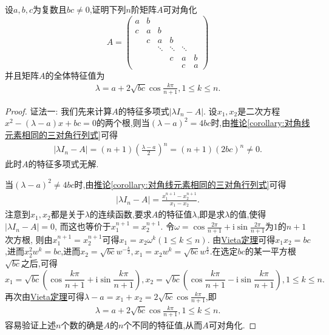 \documentclass[../../main.tex]{subfiles}%
\begin{document}
\begin{proposition}[三对角矩阵的特征值]\label{proposition:三对角矩阵必可对角化}
设$a,b,c$为复数且$bc\neq0$,证明下列$n$阶矩阵$A$可对角化
\[
A = 
\begin{pmatrix}
a&b&&&\\
c&a&b&&\\
&c&a&b&\\
&&\ddots&\ddots&\ddots\\
&&&c&a&b\\
&&&&c&a
\end{pmatrix}
\]
并且矩阵$A$的全体特征值为
\begin{align*}
\lambda=a + 2\sqrt{bc}\cos\frac{k\pi}{n + 1}, 1\leqslant  k\leqslant  n.
\end{align*}
\end{proposition}
\begin{proof}

{\color{blue}证法一:}
我们先来计算$A$的特征多项式$|\lambda I_n - A|$. 设$x_1,x_2$是二次方程$x^2 - (\lambda - a)x + bc = 0$的两个根,则当$(\lambda-a)^2 = 4bc$时,由\hyperref[corollary:对角线元素相同的三对角行列式]{推论\ref{corollary:对角线元素相同的三对角行列式}}可得
\begin{align*}
|\lambda I_n - A|=(n+1)\left( \frac{\lambda - a}{2}\right)^n=(n+1)\left( 2bc\right)^n \neq 0.
\end{align*}
此时$A$的特征多项式无解.

当$(\lambda-a)^2\ne 4bc$时,由\hyperref[corollary:对角线元素相同的三对角行列式]{推论\ref{corollary:对角线元素相同的三对角行列式}}可得
\begin{align*}
|\lambda I_n - A|=\frac{x_1^{n + 1}-x_2^{n + 1}}{x_1 - x_2}.
\end{align*}
注意到$x_1,x_2$都是关于$\lambda$的连续函数,要求$A$的特征值$\lambda$,即是求$\lambda$的值,使得$|\lambda I_n - A| = 0$, 而这也等价于$x_1^{n + 1}=x_2^{n + 1}$. 令$\omega=\cos\frac{2\pi}{n + 1}+\mathrm{i}\sin\frac{2\pi}{n + 1}$为$1$的$n + 1$次方根, 则由$x_1^{n + 1}=x_2^{n + 1}$可得$x_1 = x_2\omega^k(1\leqslant  k\leqslant  n)$. 由\hyperref[theorem:Vieta定理]{Vieta定理}可得$x_1x_2 = bc$,进而$x_2^2w^{k}=bc$,进而$x_2 = \sqrt{bc}w^{-\frac{k}{2}},x_1=x_2w^k=\sqrt{bc}w^{\frac{k}{2}}$.在选定$bc$的某一平方根$\sqrt{bc}$之后,可得
\[
x_1=\sqrt{bc}\left(\cos\frac{k\pi}{n + 1}+\mathrm{i}\sin\frac{k\pi}{n + 1}\right), x_2=\sqrt{bc}\left(\cos\frac{k\pi}{n + 1}-\mathrm{i}\sin\frac{k\pi}{n + 1}\right), 1\leqslant  k\leqslant  n.
\]
再次由\hyperref[theorem:Vieta定理]{Vieta定理}可得$\lambda - a = x_1 + x_2 = 2\sqrt{bc}\cos\frac{k\pi}{n + 1}$,即
\begin{align*}
\lambda=a + 2\sqrt{bc}\cos\frac{k\pi}{n + 1}, 1\leqslant  k\leqslant  n.
\end{align*}
容易验证上述$n$个数的确是$A$的$n$个不同的特征值,从而$A$可对角化.


\end{proof}
\end{document}
